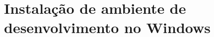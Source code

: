 \chapter{Instalação de ambiente de desenvolvimento no Windows}
\label{ap:instalacao-env-windows}
\lipsum[55-57]